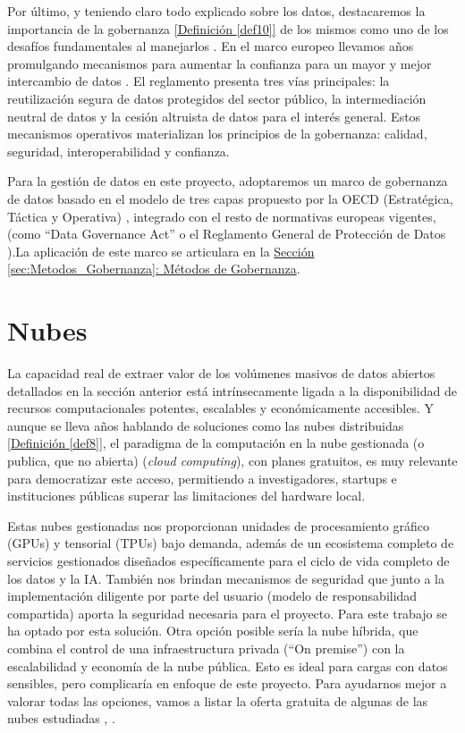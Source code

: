 	Por último, y teniendo claro todo explicado sobre los datos, destacaremos la importancia de la gobernanza \hyperref[def10]{[Definición \ref*{def10}]} de los mismos como uno de los desafíos fundamentales al manejarlos \citep{DataManagement2024Theodorakopoulos}. En el marco europeo llevamos años promulgando mecanismos para aumentar la confianza para un mayor y mejor intercambio de datos \citep{EU_DGA_2022}. El reglamento presenta tres vías principales: la reutilización segura de datos protegidos del sector público, la intermediación neutral de datos y la cesión altruista de datos para el interés general. Estos mecanismos operativos materializan los principios de la gobernanza: calidad, seguridad, interoperabilidad y confianza.
	
	Para la gestión de datos en este proyecto, adoptaremos un marco de gobernanza de datos basado en el modelo de tres capas propuesto por la OECD (Estratégica, Táctica y Operativa) \citep{OECD2019}, integrado con el resto de normativas europeas vigentes, (como ``Data Governance Act'' \citep{EU_DGA_2022} o el Reglamento General de Protección de Datos \citep{webRGPD2016Europa}).La aplicación de este marco se articulara en la \hyperref[sec:Metodos_Gobernanza]{Sección \ref*{sec:Metodos_Gobernanza}: Métodos de Gobernanza}. \newpage
	
	
\section{Nubes}
\label{sec:EstudiosNubes}

La capacidad real de extraer valor de los volúmenes masivos de datos abiertos detallados en la sección anterior está intrínsecamente ligada a la disponibilidad de recursos computacionales potentes, escalables y económicamente accesibles. Y aunque se lleva años hablando de soluciones como las nubes distribuidas \hyperref[def8]{[Definición \ref*{def8}]}, el paradigma de la computación en la nube gestionada (o publica, que no abierta) (\textit{cloud computing}), con planes gratuitos, es muy relevante para democratizar este acceso, permitiendo a investigadores, startups e instituciones públicas superar las limitaciones del hardware local.

Estas nubes gestionadas nos proporcionan unidades de procesamiento gráfico (GPUs) y tensorial (TPUs) bajo demanda, además de un ecosistema completo de servicios gestionados diseñados específicamente para el ciclo de vida completo de los datos y la IA. También nos brindan mecanismos de seguridad que junto a la implementación diligente por parte del usuario (modelo de responsabilidad compartida) aporta la seguridad necesaria para el proyecto. Para este trabajo se ha optado por esta solución.
Otra opción posible sería la nube híbrida, que combina el control de una infraestructura privada (``On premise'') con la escalabilidad y economía de la nube pública. Esto es ideal para cargas con datos sensibles, pero complicaría en enfoque de este proyecto. 
Para ayudarnos mejor a valorar todas las opciones, vamos a listar la oferta gratuita de algunas de las nubes estudiadas \citep{MicrosoftCloudTerminology}, \citep{lisdorf2021cloud}.


